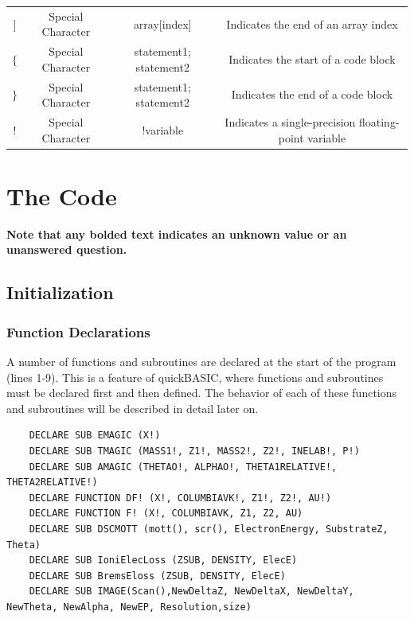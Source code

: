 \documentclass[10pt, reqno]{exam}
\begin{document}
\begin{table}[h]
\begin{tabular}{|c|c|c|c|}
    $]$ & Special Character & array[index] & Indicates the end of an array index \\
    $\{$ & Special Character & { statement1; statement2 } & Indicates the start of a code block \\
    $\}$ & Special Character & { statement1; statement2 } & Indicates the end of a code block \\
    ! & Special Character & !variable & Indicates a single-precision floating-point variable \\
    \hline
    \end{tabular}
\end{table}
\section{The Code}
\textbf{Note that any bolded text indicates an unknown value or an unanswered question.}
\subsection{Initialization}
\subsubsection{Function Declarations}
\label{sec:function declarations}

A number of functions and subroutines are declared at the start of the program (lines 1-9). This is a feature of quickBASIC, where functions and subroutines must be declared first and then defined. The behavior of each of these functions and subroutines will be described in detail later on. \par

\begin{verbatim}
    DECLARE SUB EMAGIC (X!)
    DECLARE SUB TMAGIC (MASS1!, Z1!, MASS2!, Z2!, INELAB!, P!)
    DECLARE SUB AMAGIC (THETAO!, ALPHAO!, THETA1RELATIVE!, THETA2RELATIVE!)
    DECLARE FUNCTION DF! (X!, COLUMBIAVK!, Z1!, Z2!, AU!)
    DECLARE FUNCTION F! (X!, COLUMBIAVK, Z1, Z2, AU)
    DECLARE SUB DSCMOTT (mott(), scr(), ElectronEnergy, SubstrateZ, Theta)
    DECLARE SUB IoniElecLoss (ZSUB, DENSITY, ElecE)
    DECLARE SUB BremsEloss (ZSUB, DENSITY, ElecE)
    DECLARE SUB IMAGE(Scan(),NewDeltaZ, NewDeltaX, NewDeltaY, NewTheta, NewAlpha, NewEP, Resolution,size)
\end{verbatim}
\end{document}
